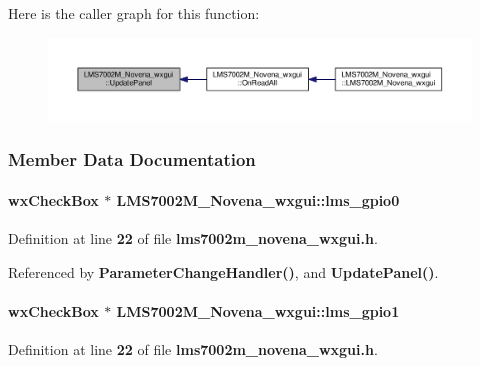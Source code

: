 Here is the caller graph for this function\+:
\nopagebreak
\begin{figure}[H]
\begin{center}
\leavevmode
\includegraphics[width=350pt]{d1/d8c/classLMS7002M__Novena__wxgui_abb571cce0c34122bc7bb6b90b5a90197_icgraph}
\end{center}
\end{figure}




\subsubsection{Member Data Documentation}
\paragraph[{lms\+\_\+gpio0}]{\setlength{\rightskip}{0pt plus 5cm}wx\+Check\+Box $\ast$ L\+M\+S7002\+M\+\_\+\+Novena\+\_\+wxgui\+::lms\+\_\+gpio0}\label{classLMS7002M__Novena__wxgui_ac07b96d7555bb3ee628fdc886fbdc59d}


Definition at line {\bf 22} of file {\bf lms7002m\+\_\+novena\+\_\+wxgui.\+h}.



Referenced by {\bf Parameter\+Change\+Handler()}, and {\bf Update\+Panel()}.

\paragraph[{lms\+\_\+gpio1}]{\setlength{\rightskip}{0pt plus 5cm}wx\+Check\+Box $\ast$ L\+M\+S7002\+M\+\_\+\+Novena\+\_\+wxgui\+::lms\+\_\+gpio1}\label{classLMS7002M__Novena__wxgui_a46459f93d91dc4404b959088eed46cf9}


Definition at line {\bf 22} of file {\bf lms7002m\+\_\+novena\+\_\+wxgui.\+h}.



